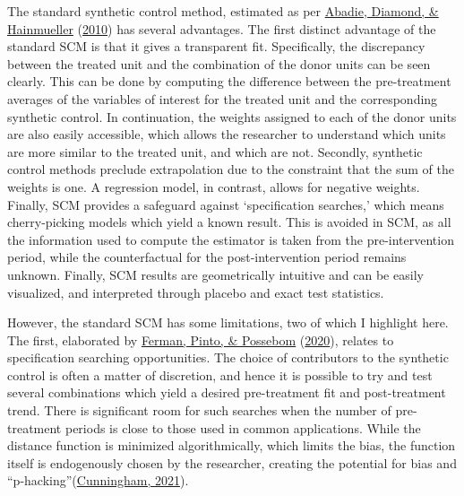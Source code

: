 \documentclass[12pt,nobind, a4paper]{reedthesis}
\begin{document}
 The standard synthetic control method, estimated as per \protect\hyperlink{ref-abadie_synthetic_2010}{Abadie, Diamond, \& Hainmueller} (\protect\hyperlink{ref-abadie_synthetic_2010}{2010}) has several advantages. The first distinct advantage of the standard SCM is that it gives a transparent fit. Specifically, the discrepancy between the treated unit and the combination of the donor units can be seen clearly. This can be done by computing the difference between the pre-treatment averages of the variables of interest for the treated unit and the corresponding synthetic control. In continuation, the weights assigned to each of the donor units are also easily accessible, which allows the researcher to understand which units are more similar to the treated unit, and which are not. Secondly, synthetic control methods preclude extrapolation due to the constraint that the sum of the weights is one. A regression model, in contrast, allows for negative weights. Finally, SCM provides a safeguard against `specification searches,' which means cherry-picking models which yield a known result. This is avoided in SCM, as all the information used to compute the estimator is taken from the pre-intervention period, while the counterfactual for the post-intervention period remains unknown. Finally, SCM results are geometrically intuitive and can be easily visualized, and interpreted through placebo and exact test statistics.
 \linebreak

 However, the standard SCM has some limitations, two of which I highlight here. The first, elaborated by \protect\hyperlink{ref-ferman_cherry_2020}{Ferman, Pinto, \& Possebom} (\protect\hyperlink{ref-ferman_cherry_2020}{2020}), relates to specification searching opportunities. The choice of contributors to the synthetic control is often a matter of discretion, and hence it is possible to try and test several combinations which yield a desired pre-treatment fit and post-treatment trend. There is significant room for such searches when the number of pre-treatment periods is close to those used in common applications. While the distance function is minimized algorithmically, which limits the bias, the function itself is endogenously chosen by the researcher, creating the potential for bias and ``p-hacking''(\protect\hyperlink{ref-cunningham_causal_2021}{Cunningham, 2021}).
 \linebreak
\end{document}
